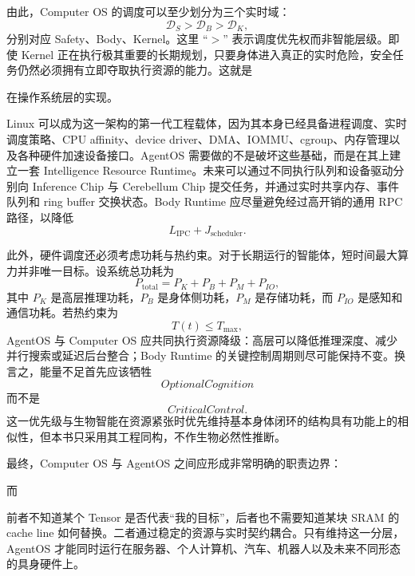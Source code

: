 由此，Computer OS 的调度可以至少划分为三个实时域：
\[
\mathcal D_S
>
\mathcal D_B
>
\mathcal D_K,
\]
分别对应 Safety、Body、Kernel。这里 ``$>$'' 表示调度优先权而非智能层级。即使 Kernel 正在执行极其重要的长期规划，只要身体进入真正的实时危险，安全任务仍然必须拥有立即夺取执行资源的能力。这就是
\begin{statementbox}
\centering
{}
\end{statementbox}
在操作系统层的实现。

Linux 可以成为这一架构的第一代工程载体，因为其本身已经具备进程调度、实时调度策略、CPU affinity、device driver、DMA、IOMMU、cgroup、内存管理以及各种硬件加速设备接口。AgentOS 需要做的不是破坏这些基础，而是在其上建立一套 Intelligence Resource Runtime。未来可以通过不同执行队列和设备驱动分别向 Inference Chip 与 Cerebellum Chip 提交任务，并通过实时共享内存、事件队列和 ring buffer 交换状态。Body Runtime 应尽量避免经过高开销的通用 RPC 路径，以降低
\[
L_{\mathrm{IPC}}+J_{\mathrm{scheduler}}.
\]

此外，硬件调度还必须考虑功耗与热约束。对于长期运行的智能体，短时间最大算力并非唯一目标。设系统总功耗为
\[
P_{\mathrm{total}}
=
P_K+P_B+P_M+P_{IO},
\]
其中 $P_K$ 是高层推理功耗，$P_B$ 是身体侧功耗，$P_M$ 是存储功耗，而 $P_{IO}$ 是感知和通信功耗。若热约束为
\[
T(t)\leq T_{\max},
\]
AgentOS 与 Computer OS 应共同执行资源降级：高层可以降低推理深度、减少并行搜索或延迟后台整合；Body Runtime 的关键控制周期则尽可能保持不变。换言之，能量不足首先应该牺牲
\[
OptionalCognition
\]
而不是
\[
CriticalControl.
\]
这一优先级与生物智能在资源紧张时优先维持基本身体闭环的结构具有功能上的相似性，但本书只采用其工程同构，不作生物必然性推断。

最终，Computer OS 与 AgentOS 之间应形成非常明确的职责边界：
\begin{statementbox}
\centering
{}
\end{statementbox}
而
\begin{statementbox}
\centering
{}
\end{statementbox}
前者不知道某个 Tensor 是否代表“我的目标”，后者也不需要知道某块 SRAM 的 cache line 如何替换。二者通过稳定的资源与实时契约耦合。只有维持这一分层，AgentOS 才能同时运行在服务器、个人计算机、汽车、机器人以及未来不同形态的具身硬件上。

